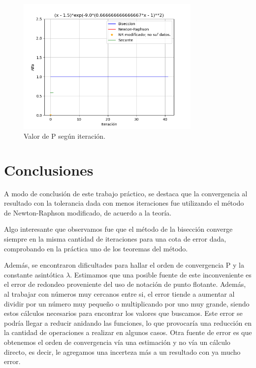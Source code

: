 \documentclass[titlepage,a4paper]{article}
\begin{document}
\begin{figure}[H]
    \centering
    \includegraphics[width=0.8\textwidth]{alfa f3.png}
    \caption{\label{fig:alfaf3}Valor de P según iteración.}
\end{figure}

\newpage

\section{Conclusiones}\label{sec:conclusiones} %

A modo de conclusión de este trabajo práctico, se destaca que la convergencia al resultado con la tolerancia dada con menos iteraciones fue utilizando el método de Newton-Raphson modificado, de acuerdo a la teoría. 

Algo interesante que observamos fue que el método de la bisección converge siempre en la misma cantidad de iteraciones para una cota de error dada, comprobando en la práctica uno de los teoremas del método.

Además, se encontraron dificultades para hallar el orden de convergencia P y la constante asintótica $\lambda$. Estimamos que una posible fuente de este inconveniente es el error de redondeo proveniente del uso de notación de punto flotante. Además, al trabajar con números muy cercanos entre si, el error tiende a aumentar al dividir por un número muy pequeño o multiplicando por uno muy grande, siendo estos cálculos necesarios para encontrar los valores que buscamos. Este error se podría llegar a reducir anidando las funciones, lo que provocaría una reducción en la cantidad de operaciones a realizar en algunos casos. 
Otra fuente de error es que obtenemos el orden de convergencia vía una estimación y no vía un cálculo directo, es decir, le agregamos una incerteza más a un resultado con ya mucho error.
\end{document}
